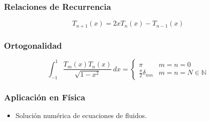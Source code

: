 \subsubsection{Relaciones de Recurrencia}

\begin{equation}
T_{n+1}(x)=2xT_{n}(x)-T_{n-1}(x)
\end{equation}

\subsubsection{Ortogonalidad}

\begin{equation}
\int_{-1}^{1}\frac{T_{m}(x)T_{n}(x)}{\sqrt{1-x^{2}}}\,dx= \left\{\begin{array}{ll}\pi & m=n=0\\ \frac{\pi}{2}\delta_{mn} & m=n=N \in \mathbb{N} \end{array}\right.
\end{equation}

\subsubsection{Aplicación en Física}
\begin{itemize}
\item Solución numérica de ecuaciones de fluidos.
\end{itemize}